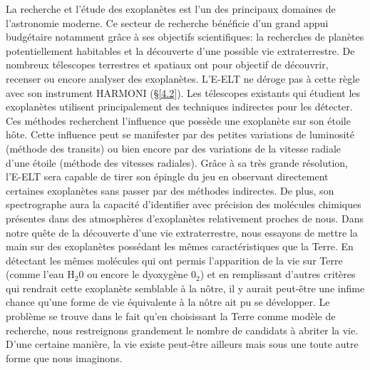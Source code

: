 La recherche et l'étude des exoplanètes est l'un des principaux domaines de l'astronomie moderne. Ce secteur de recherche bénéficie d'un grand appui budgétaire notamment grâce à ses objectifs scientifiques: la recherches de planètes potentiellement habitables et la découverte d'une possible vie extraterrestre. De nombreux télescopes terrestres et spatiaux ont pour objectif de découvrir, recenser ou encore analyser des exoplanètes. L'E-ELT ne déroge pas à cette règle avec son instrument HARMONI (§\ref{4.2}). Les télescopes existants qui étudient les exoplanètes utilisent principalement des techniques indirectes pour les détecter. Ces méthodes recherchent l'influence que possède une exoplanète sur son étoile hôte. Cette influence peut se manifester par des petites variations de luminosité (méthode des transits) ou bien encore par des variations de la vitesse radiale d'une étoile (méthode des vitesses radiales). Grâce à sa très grande résolution, l'E-ELT sera capable de tirer son épingle du jeu en observant directement certaines exoplanètes sans passer par des méthodes indirectes. De plus, son spectrographe aura la capacité d'identifier avec précision des molécules chimiques présentes dans des atmosphères d'exoplanètes relativement proches de nous. Dans notre quête de la découverte d'une vie extraterrestre, nous essayons de mettre la main sur des exoplanètes possédant les mêmes caractéristiques que la Terre. En détectant les mêmes molécules qui ont permis l'apparition de la vie sur Terre (comme l'eau H$_{2} 0$ ou encore le dyoxygène $0_{2}$) et en remplissant d'autres critères qui rendrait cette exoplanète semblable à la nôtre, il y aurait peut-être une infime chance qu'une forme de vie équivalente à la nôtre ait pu se développer. Le problème se trouve dans le fait qu'en choisissant la Terre comme modèle de recherche, nous restreignons grandement le nombre de candidats à abriter la vie. D'une certaine manière, la vie existe peut-être ailleurs mais sous une toute autre forme que nous imaginons.










